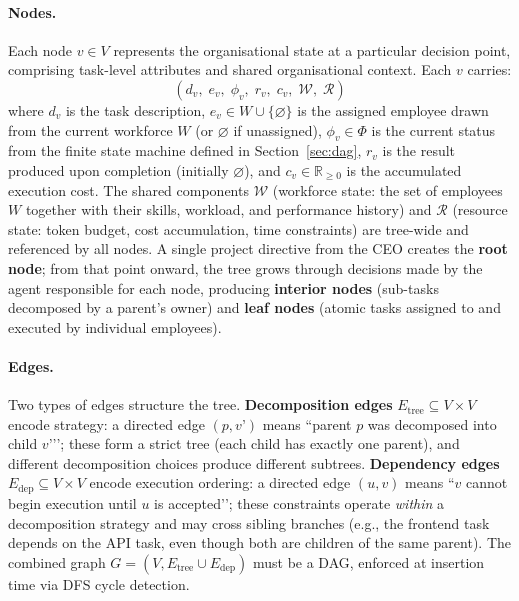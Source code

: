 \documentclass[11pt,a4paper]{article}
\begin{document}
\paragraph{Nodes.}
Each node $v \in V$ represents the organisational state at a particular decision point, comprising task-level attributes and shared organisational context.  Each $v$ carries:
\begin{equation}
(d_v,\; e_v,\; \phi_v,\; r_v,\; c_v,\; \mathcal{W},\; \mathcal{R})
\end{equation}
where $d_v$ is the task description, $e_v \in W \cup \{\varnothing\}$ is the assigned employee drawn from the current workforce $W$ (or $\varnothing$ if unassigned), $\phi_v \in \Phi$ is the current status from the finite state machine defined in Section~\ref{sec:dag}, $r_v$ is the result produced upon completion (initially $\varnothing$), and $c_v \in \mathbb{R}_{\geq 0}$ is the accumulated execution cost.  The shared components $\mathcal{W}$ (workforce state: the set of employees $W$ together with their skills, workload, and performance history) and $\mathcal{R}$ (resource state: token budget, cost accumulation, time constraints) are tree-wide and referenced by all nodes.  A single project directive from the CEO creates the \textbf{root node}; from that point onward, the tree grows through decisions made by the agent responsible for each node, producing \textbf{interior nodes} (sub-tasks decomposed by a parent’s owner) and \textbf{leaf nodes} (atomic tasks assigned to and executed by individual employees).

\paragraph{Edges.}
Two types of edges structure the tree.  \textbf{Decomposition edges} $E_{\text{tree}} \subseteq V \times V$ encode strategy: a directed edge $(p, v’)$ means ``parent $p$ was decomposed into child $v’$’’; these form a strict tree (each child has exactly one parent), and different decomposition choices produce different subtrees.  \textbf{Dependency edges} $E_{\text{dep}} \subseteq V \times V$ encode execution ordering: a directed edge $(u, v)$ means ``$v$ cannot begin execution until $u$ is accepted’’; these constraints operate \emph{within} a decomposition strategy and may cross sibling branches (e.g., the frontend task depends on the API task, even though both are children of the same parent).  The combined graph $G = (V, E_{\text{tree}} \cup E_{\text{dep}})$ must be a DAG, enforced at insertion time via DFS cycle detection.
\end{document}
